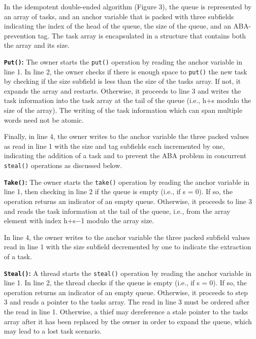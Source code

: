 
In the idempotent double-ended algorithm (Figure 3), the queue is
represented by an array of tasks, and an anchor variable that is
packed with three subfields indicating the index of the head of the
queue, the size of the queue, and an ABA-prevention tag. The task
array is encapsulated in a structure that contains both the array and
its size.

\textbf{\lstinline!Put()!:} The owner starts the \lstinline!put()!
operation by reading the anchor variable in line 1. In line 2, the
owner checks if there is enough space to \lstinline!put()! the new task
by checking if the size subfield is less than the size of the tasks
array. If not, it expands the array and restarts. Otherwise, it
proceeds to line 3 and writes the task information into the task array
at the tail of the queue (i.e., h+s modulo the size of the array). The
writing of the task information which can span multiple words need not
be atomic.

Finally, in line 4, the owner writes to the anchor variable the three
packed values as read in line 1 with the size and tag subfields each
incremented by one, indicating the addition of a task and to prevent
the ABA problem in concurrent \lstinline!steal()! operations as
discussed below.

\textbf{\lstinline!Take()!:} The owner starts the \lstinline!take()!
operation by reading the anchor variable in line 1, then checking in
line 2 if the queue is empty (i.e., if s = 0). If so, the operation
returns an indicator of an empty queue. Otherwise, it proceeds to
line 3 and reads the task information at the tail of the queue, i.e.,
from the array element with index h+s−1 modulo the array size.

In line 4, the owner writes to the anchor variable the three packed
subfield values read in line 1 with the size subfield decremented by
one to indicate the extraction of a task.

\textbf{\lstinline!Steal()!:} A thread starts the \lstinline!steal()!
operation by reading the anchor variable in line 1. In line 2, the
thread checks if the queue is empty (i.e., if s = 0). If so, the
operation returns an indicator of an empty queue. Otherwise, it
proceeds to step 3 and reads a pointer to the tasks array. The read in
line 3 must be ordered after the read in line 1. Otherwise, a thief
may dereference a stale pointer to the tasks array after it has been
replaced by the owner in order to expand the queue, which may lead to
a lost task scenario.

